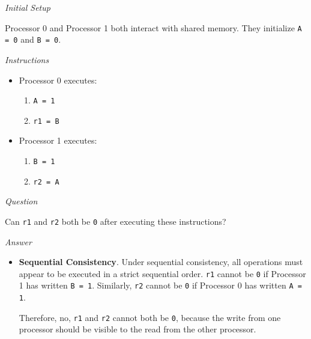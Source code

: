 \begin{examplebox}
    \begin{flushleft}
        \emph{Initial Setup}
    \end{flushleft}
    Processor 0 and Processor 1 both interact with shared memory. They initialize \texttt{A = 0} and \texttt{B = 0}.

    \highspace
    \begin{flushleft}
        \emph{Instructions}
    \end{flushleft}
    \begin{itemize}
        \item Processor 0 executes:
        \begin{enumerate}
            \item \texttt{A = 1}
            \item \texttt{r1 = B}
        \end{enumerate}

        \item Processor 1 executes:
        \begin{enumerate}
            \item \texttt{B = 1}
            \item \texttt{r2 = A}
        \end{enumerate}
    \end{itemize}

    \highspace
    \begin{flushleft}
        \emph{Question}
    \end{flushleft}
    Can \texttt{r1} and \texttt{r2} both be \texttt{0} after executing these instructions?

    \newpage

    \begin{flushleft}
        \emph{Answer}
    \end{flushleft}
    \begin{itemize}
        \item \textbf{Sequential Consistency}. Under sequential consistency, all operations must appear to be executed in a strict sequential order. \texttt{r1} cannot be \texttt{0} if Processor 1 has written \texttt{B = 1}. Similarly, \texttt{r2} cannot be \texttt{0} if Processor 0 has written \texttt{A = 1}.
        
        Therefore, no, \texttt{r1} and \texttt{r2} cannot both be \texttt{0}, because the write from one processor should be visible to the read from the other processor.



\end{itemize}
\end{examplebox}
